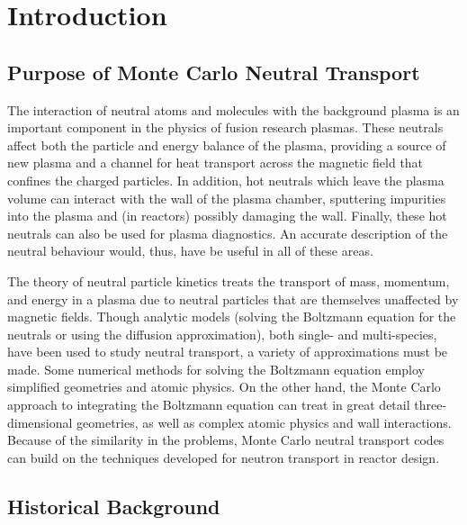 \documentclass[12pt]{report}
\begin{document}
\chapter{Introduction}

\section{Purpose of Monte Carlo Neutral Transport}

The interaction of neutral atoms and molecules with the background 
plasma is an important component in the physics of fusion research
plasmas. These
neutrals affect both the particle and energy balance  of the plasma,
providing a source of new plasma and a channel for heat transport across
the magnetic field that confines the charged particles. In addition, hot
neutrals which leave the plasma volume can interact with the wall of the
plasma chamber, sputtering impurities into the plasma and (in reactors)
possibly damaging the wall. Finally, these hot neutrals can also be used
for plasma diagnostics. An accurate
description of the neutral behaviour would, thus, have be useful
in all of these areas.

The theory of neutral particle kinetics\cite{Tend87}
treats the transport of mass, momentum, and energy in a plasma due to
neutral particles that are themselves unaffected by magnetic
fields.  Though analytic models (solving the
Boltzmann equation for the neutrals or using the diffusion approximation),
both single- and multi-species, have been used to study neutral transport,
a variety of approximations must be made. Some numerical methods for solving
the Boltzmann equation employ simplified geometries and atomic physics. On
the other hand, the Monte Carlo approach to integrating the Boltzmann
equation can treat in great detail three-dimensional geometries, as well as complex
atomic physics and wall interactions. Because of the similarity in the
problems, Monte Carlo neutral transport codes can build on the techniques
developed for neutron transport in reactor design\cite{Span69}.

\section{Historical Background}
\end{document}
